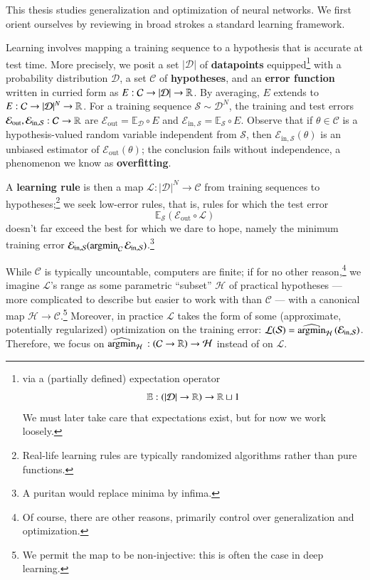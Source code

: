 \documentclass[openany, notitlepage, justified]{tufte-book}
\theoremstyle{plain}
\theoremstyle{definition}
\newcommand{\argmin}{\text{\textnormal{argmin}}}
\newcommand{\Cc}{\mathcal{C}}   \newcommand{\CC}{\mathbb{C}}
\newcommand{\Dd}{\mathcal{D}}
\newcommand{\Ee}{\mathcal{E}}   \newcommand{\EE}{\mathbb{E}}
\newcommand{\Hh}{\mathcal{H}}
\newcommand{\Ll}{\mathcal{L}}
\newcommand{\Ss}{\mathcal{S}}
\begin{document}
        This thesis studies generalization and optimization of neural networks.
        We first orient ourselves by reviewing in broad strokes a
        standard\cite{ab12, ra19} learning framework.

        \newcommand{\Eout}{\Ee_{\text{out}}}
        \newcommand{\Ein }{\Ee_{\text{in},\Ss}}
        \newcommand{\optH}{\widehat{\argmin}_{\Hh}\,}
        \newcommand{\amH }{\argmin_{\Hh}\,}
        \newcommand{\amC }{\argmin_{\Cc}\,}

        Learning involves mapping a training sequence to a hypothesis that is
        accurate at test time.  More precisely, we posit a set $|\Dd|$ of
        \textbf{datapoints} equipped\footnote{
            via a (partially defined) expectation operator
            $$\EE:(|\Dd|\to\RR)\to\RR\sqcup 1$$ 
            We must later take care that expectations exist, but
            for now we work loosely.
        } with a probability distribution $\Dd$,
        a set $\Cc$ of \textbf{hypotheses}, and an \textbf{error
        function} written in curried form as $E:\Cc\to|\Dd|\to\RR$.
        By averaging, $E$ extends to $E:\Cc\to|\Dd|^N\to\RR$.  For a
        training sequence $\Ss \sim \Dd^N$, the training and test
        errors $\Eout, \Ein: \Cc\to \RR$ are $\Eout = \EE_{\Dd} \circ E$ and
        $\Ein = \EE_{\Ss} \circ E$.  Observe that if $\theta\in \Cc$ is a
        hypothesis-valued random variable independent from $\Ss$, then
        $\Ein(\theta)$ is an unbiased estimator of $\Eout(\theta)$; the
        conclusion fails without independence, a phenomenon we know as
        \textbf{overfitting}.

        A \textbf{learning rule} is then a
        map $\Ll:|\Dd|^N\to \Cc$ from training sequences to hypotheses;\footnote{
            Real-life learning rules are typically randomized algorithms rather
            than pure functions.
        } we seek low-error rules, that is, rules for which the test error
        $$
            \EE_{\Ss}(\Eout \circ \Ll)
        $$
        doesn't far exceed the best for which we dare to hope, namely the
        minimum training error $\Ein(\amC\Ein)$.\footnote{
            A puritan would replace minima by infima.
        }

        While $\Cc$ is typically uncountable, computers are finite; if for no
        other reason,\footnote{
            Of course, there are other reasons, primarily control over
            generalization and optimization.
        }
        we imagine $\Ll$'s range as some parametric ``subset'' $\Hh$ of
        practical hypotheses --- more complicated to describe but easier to
        work with than $\Cc$ ---  with a canonical map $\Hh \to \Cc$.\footnote{
            We permit the map to be non-injective: this is often the case in 
            deep learning.
        } Moreover, in practice $\Ll$ takes the form of
        some (approximate, potentially regularized) optimization on the
        training error: $\Ll(\Ss) = \optH(\Ein)$.  Therefore, we focus on
        $\optH:(\Cc\to\RR)\to \Hh$ instead of on $\Ll$.
\end{document}
